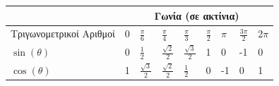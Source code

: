 \documentclass{beamer}
\begin{document}
\begin{frame}
	\begin{table}[]
		\centering
		\begin{tabular}{|l|llllllll|}
			\hline
			& \multicolumn{8}{c|}{\cellcolor[HTML]{AB5E5E}Γωνία (σε ακτίνια)}                                                                                                                                                                                                \\ \hline
			\multicolumn{1}{|c|}{\cellcolor[HTML]{AB5E5E}Τριγωνομετρικοί Αριθμοί} & \multicolumn{1}{l|}{0} & \multicolumn{1}{l|}{$\frac{\pi}{6}$}      & \multicolumn{1}{l|}{$\frac{\pi}{4}$}      & \multicolumn{1}{l|}{$\frac{\pi}{3}$}      & \multicolumn{1}{l|}{$\frac{\pi}{2}$} & \multicolumn{1}{l|}{$\pi$} & \multicolumn{1}{l|}{$\frac{3\pi}{2}$} & 2$\pi$ \\ \hline
			$\sin(\theta)$                                                        & \multicolumn{1}{l|}{0} & \multicolumn{1}{l|}{$\frac{1}{2}$}        & \multicolumn{1}{l|}{$\frac{\sqrt{2}}{2}$} & \multicolumn{1}{l|}{$\frac{\sqrt{3}}{2}$} & \multicolumn{1}{l|}{1}               & \multicolumn{1}{l|}{0}     & \multicolumn{1}{l|}{-1}               & 0      \\ \hline
			$\cos(\theta)$                                                        & \multicolumn{1}{l|}{1} & \multicolumn{1}{l|}{$\frac{\sqrt{3}}{2}$} & \multicolumn{1}{l|}{$\frac{\sqrt{2}}{2}$} & \multicolumn{1}{l|}{$\frac{1}{2}$}        & \multicolumn{1}{l|}{0}               & \multicolumn{1}{l|}{-1}    & \multicolumn{1}{l|}{0}                & 1      \\ \hline
		\end{tabular}
	\end{table}
\end{frame}
\end{document}
